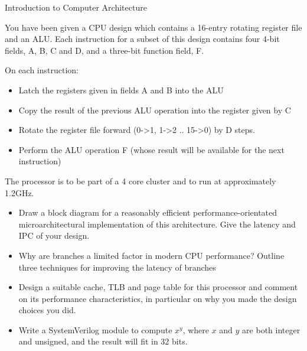 \documentclass{tripos}  %
\begin{document}
\begin{question}[MockIA,year=2024,paper=1,question=2,author=rrw]{Introduction to Computer Architecture}


You have been given a CPU design which contains a 16-entry rotating register file and an ALU.
Each instruction for a subset of this design contains four 4-bit fields, A, B, C and D,
and a three-bit function field, F.

On each instruction:

\begin{itemize}
\item Latch the registers given in fields A and B into the ALU
\item Copy the result of the previous ALU operation into the register given by C
\item Rotate the register file forward (0->1, 1->2 .. 15->0) by D steps.
\item Perform the ALU operation F (whose result will be available for the next instruction)
\end{itemize}

The processor is to be part of a 4 core cluster and to run at approximately 1.2GHz.

\begin{itemize}
\item Draw a block diagram for a reasonably efficient performance-orientated microarchitectural implementation of this architecture. Give the latency and IPC of your design. 
\item Why are branches a limited factor in modern CPU performance? Outline three techniques for improving the latency of branches 
\item Design a suitable cache, TLB and page table for this processor and comment on its performance characteristics, in particular on why you made the design choices you did. 
\item Write a SystemVerilog module to compute $x^y$, where $x$ and $y$ are both integer and unsigned, and the result will fit in 32 bits. 
\end{itemize}
\end{question}
\end{document}
